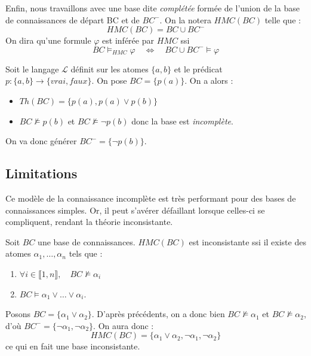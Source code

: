 Enfin, nous travaillons avec une base dite \emph{complétée} formée de l'union de la base de connaissances de départ BC et 
de $BC^-$. On la notera $ HMC(BC)$ telle que : 
    $$ HMC(BC) = BC \cup BC^- $$ 
On dira qu'une formule $ \varphi$ est inférée par $HMC$ ssi 
    $$ BC \models_{HMC} \varphi \quad \iff \quad BC \cup BC^- \models \varphi $$ 

\begin{example}
    Soit le langage $ \mathcal{L}$ définit sur les atomes $ \{a,b\}$ et le prédicat $ p : \{a, b\} \longrightarrow \{vrai, faux\}$. 
    On pose $ BC = \{p(a)\}$. On a alors : 
    \begin{itemize}
        \item $ Th(BC) = \{p(a), p(a) \lor p(b)\}$ 
        \item $ BC \nvDash p(b)$ et $ BC \nvDash \lnot p(b)$ donc la base est \emph{incomplète}.
    \end{itemize}
    On va donc générer $ BC^- = \{ \lnot p(b)\}$. 
\end{example}

\subsection{Limitations}

Ce modèle de la connaissance incomplète est très performant pour des bases de connaissances simples. 
Or, il peut s'avérer défaillant lorsque celles-ci se compliquent, rendant la théorie inconsistante. 

\begin{prop}[Inconsistance]
    Soit $BC$ une base de connaissances. $HMC(BC)$ est inconsistante ssi il existe des atomes $ \alpha_1, \dots, \alpha_n$ 
    tels que : 
    \begin{enumerate}[label=\roman*)]
        \item $ \forall i \in \llbracket 1, n \rrbracket, \quad BC \nvDash \alpha_i$ 
        \item $ BC \models \alpha_1 \lor \dots \lor \alpha_i$. 
    \end{enumerate}
\end{prop}

\begin{example}
    Posons $BC = \{ \alpha_1 \lor \alpha_2\}$. D'après précédents, on a donc bien $ BC \nvDash \alpha_1$ et 
    $ BC \nvDash \alpha_2$, d'où $BC^- = \{ \lnot \alpha_1, \lnot \alpha_2\}$. On aura donc : 
        $$ HMC(BC) = \{ \alpha_1 \lor \alpha_2, \lnot \alpha_1, \lnot \alpha_2\} $$ 
    ce qui en fait une base inconsistante. 
\end{example}

